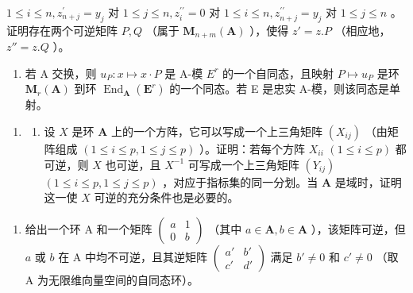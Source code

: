 \(1 \leqslant i \leqslant n, z_{n+j}^{\prime} = y_{j}\) 对 \(1 \leqslant j \leqslant n, z_{i}^{\prime \prime} = 0\) 对 \(1 \leqslant i \leqslant n, z_{n+j}^{\prime \prime} = y_{j}\) 对 \(1 \leqslant j \leqslant n\) 。证明存在两个可逆矩阵 \(P, Q\) （属于 \(\mathbf{M}_{n+m}(\mathbf{A})\) ），使得 \(z' = z.P\) （相应地， \(z'' = z.Q\) ）。

\begin{enumerate}
\def\labelenumi{(\alph{enumi})}
\setcounter{enumi}{2}
\tightlist
\item
  若 A 交换，则 \(u_{P}: x \mapsto x \cdot P\) 是 A-模 \(E^{r}\) 的一个自同态，且映射 \(P \mapsto u_{P}\) 是环 \(\mathbf{M}_{r}(\mathbf{A})\) 到环 \(\operatorname{End}_{\mathbf{A}}(\mathbf{E}^{r})\) 的一个同态。若 E 是忠实 A-模，则该同态是单射。
\end{enumerate}

\begin{enumerate}
\def\labelenumi{\arabic{enumi}.}
\setcounter{enumi}{1}
\tightlist
\item
  \begin{enumerate}
  \def\labelenumii{(\alph{enumii})}
  \tightlist
  \item
    设 \(X\) 是环 \(\mathbf{A}\) 上的一个方阵，它可以写成一个上三角矩阵 \((X_{ij})\) （由矩阵组成 \((1 \leqslant i \leqslant p, 1 \leqslant j \leqslant p)\) ）。证明：若每个方阵 \(X_{ii}\) \((1 \leqslant i \leqslant p)\) 都可逆，则 \(X\) 也可逆，且 \(X^{-1}\) 可写成一个上三角矩阵 \((Y_{ij})\) \((1 \leqslant i \leqslant p, 1 \leqslant j \leqslant p)\) ，对应于指标集的同一分划。当 \(\mathbf{A}\) 是域时，证明这一使 \(X\) 可逆的充分条件也是必要的。
  \end{enumerate}
\end{enumerate}

\begin{enumerate}
\def\labelenumi{(\alph{enumi})}
\setcounter{enumi}{1}
\tightlist
\item
  给出一个环 A 和一个矩阵 \(\begin{pmatrix} a & 1 \\ 0 & b \end{pmatrix}\) （其中 \(a \in \mathbf{A}, b \in \mathbf{A}\) ），该矩阵可逆，但 \(a\) 或 \(b\) 在 A 中均不可逆，且其逆矩阵 \(\begin{pmatrix} a' & b' \\ c' & d' \end{pmatrix}\) 满足 \(b' \neq 0\) 和 \(c' \neq 0\) （取 A 为无限维向量空间的自同态环）。
\end{enumerate}

